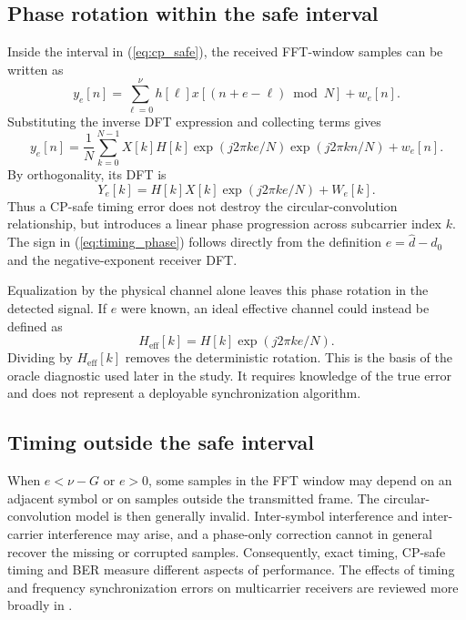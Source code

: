 \subsection{Phase rotation within the safe interval}
Inside the interval in (\ref{eq:cp_safe}), the received FFT-window samples can be written as
\begin{equation}
 y_e[n]=\sum_{\ell=0}^{\nu}h[\ell]x[(n+e-\ell)\bmod N]+w_e[n].
\end{equation}
Substituting the inverse DFT expression and collecting terms gives
\begin{equation}
 y_e[n]=\frac{1}{N}\sum_{k=0}^{N-1}X[k]H[k]
 \exp(j2\pi ke/N)\exp(j2\pi kn/N)+w_e[n].
\end{equation}
By orthogonality, its DFT is
\begin{equation}
 \boxed{Y_e[k]=H[k]X[k]\exp(j2\pi ke/N)+W_e[k].}
 \label{eq:timing_phase}
\end{equation}
Thus a CP-safe timing error does not destroy the circular-convolution relationship, but introduces a linear phase progression across subcarrier index $k$. The sign in (\ref{eq:timing_phase}) follows directly from the definition $e=\widehat d-d_0$ and the negative-exponent receiver DFT.

Equalization by the physical channel alone leaves this phase rotation in the detected signal. If $e$ were known, an ideal effective channel could instead be defined as
\begin{equation}
 H_{\mathrm{eff}}[k]=H[k]\exp(j2\pi ke/N).
 \label{eq:effective_channel}
\end{equation}
Dividing by $H_{\mathrm{eff}}[k]$ removes the deterministic rotation. This is the basis of the oracle diagnostic used later in the study. It requires knowledge of the true error and does not represent a deployable synchronization algorithm.

\subsection{Timing outside the safe interval}
When $e<\nu-G$ or $e>0$, some samples in the FFT window may depend on an adjacent symbol or on samples outside the transmitted frame. The circular-convolution model is then generally invalid. Inter-symbol interference and inter-carrier interference may arise, and a phase-only correction cannot in general recover the missing or corrupted samples. Consequently, exact timing, CP-safe timing and BER measure different aspects of performance. The effects of timing and frequency synchronization errors on multicarrier receivers are reviewed more broadly in \cite{morelli2007}.


